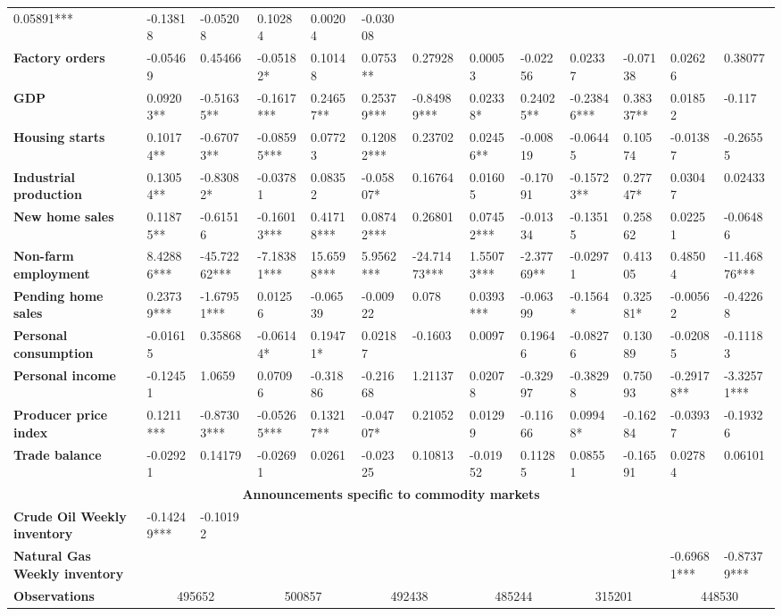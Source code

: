 \begin{sidewaystable}
{\begin{tabular}{@{}lllllllllllll@{}}
0.05891*** & -0.13818 & -0.05208 & 0.10284 & 0.00204 & -0.03008 \\ \textbf{Factory orders}& -0.05469 & 0.45466 & -0.05182* & 0.10148 & 0.0753**& 0.27928 & 0.00053 & -0.02256 & 0.02337 & -0.07138 & 0.02626 & 0.38077 \\ \textbf{GDP}& 0.09203** & -0.51635** & -0.1617*** & 0.24657** & 0.25379***& -0.84989***& 0.02338* & 0.24025** & -0.23846*** & 0.38337** & 0.01852 & -0.117 \\ \textbf{Housing starts}& 0.10174** & -0.67073** & -0.08595*** & 0.07723 & 0.12082***& 0.23702 & 0.02456** & -0.00819 & -0.06445 & 0.10574 & -0.01387 & -0.26555 \\ \textbf{Industrial production}& 0.13054** & -0.83082* & -0.03781 & 0.08352 & -0.05807* & 0.16764 & 0.01605 & -0.17091 & -0.15723** & 0.27747* & 0.03047 & 0.02433 \\ \textbf{New home sales}& 0.11875** & -0.61516 & -0.16013*** & 0.41718*** & 0.08742***& 0.26801 & 0.07452*** & -0.01334 & -0.13515 & 0.25862 & 0.02251 & -0.06486 \\ \textbf{Non-farm employment}& 8.42886*** & -45.72262*** & -7.18381*** & 15.6598*** & 5.9562***& -24.71473***& 1.55073*** & -2.37769** & -0.02971 & 0.41305 & 0.48504 & -11.46876*** \\ \textbf{Pending home sales}& 0.23739*** & -1.67951*** & 0.01256 & -0.06539 & -0.00922 & 0.078 & 0.0393*** & -0.06399 & -0.1564* & 0.32581* & -0.00562 & -0.42268 \\ \textbf{Personal consumption}& -0.01615 & 0.35868 & -0.06144* & 0.19471* & 0.02187 & -0.1603 & 0.0097 & 0.19646 & -0.08276 & 0.13089 & -0.02085 & -0.11183 \\ \textbf{Personal income}& -0.12451 & 1.0659 & 0.07096 & -0.31886 & -0.21668 & 1.21137 & 0.02078 & -0.32997 & -0.38298 & 0.75093 & -0.29178** & -3.32571*** \\ \textbf{Producer price index}& 0.1211*** & -0.87303*** & -0.05265*** & 0.13217** & -0.04707* & 0.21052 & 0.01299 & -0.11666 & 0.09948* & -0.16284 & -0.03937 & -0.19326 \\ \textbf{Trade balance}& -0.02921 & 0.14179 & -0.02691 & 0.0261 & -0.02325 & 0.10813 & -0.01952 & 0.11285 & 0.08551 & -0.16591 & 0.02784 & 0.06101 \\  \midrule \multicolumn{13}{c}{\textbf{Announcements specific to commodity markets}} \\ \midrule \textbf{Crude Oil Weekly inventory}& -0.14249*** & -0.10192 &  &  &  &  &  &  &  &  &  &  \\ \textbf{Natural Gas Weekly inventory}&  &  &  &  &  &  &  &  &  &  & -0.69681*** & -0.87379*** \\  \midrule \textbf{Observations}             &\multicolumn{2}{c}{ 495652 }                                                 & \multicolumn{2}{c}{ 500857 }                                                 & \multicolumn{2}{c}{ 492438 }                                                 & \multicolumn{2}{c}{ 485244 }                                                 & \multicolumn{2}{c}{ 315201 }                                                   & \multicolumn{2}{c}{ 448530 }                    
\end{tabular}}
\end{sidewaystable}
